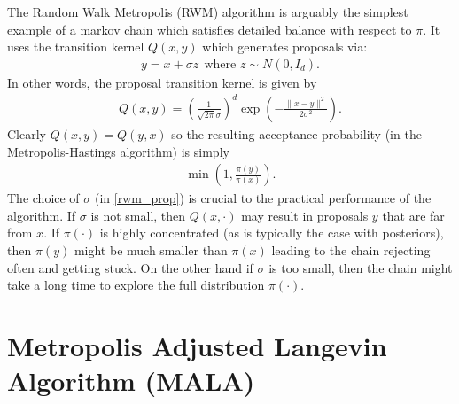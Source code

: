 \documentclass{scrartcl}
\begin{document}
The Random Walk Metropolis (RWM) algorithm is arguably the simplest
example of a markov chain which satisfies detailed balance with
respect to $\pi$. It uses the transition kernel $Q(x, y)$ which
generates proposals via:
\begin{align}\label{rwm_y}
  y = x + \sigma z ~~ \text{where $z \sim N(0, I_d)$}. 
\end{align}
In other words, the proposal transition kernel is given by
\begin{align}\label{rwm_prop}
  Q(x, y) = \left(\frac{1}{\sqrt{2 \pi} \sigma} \right)^d \exp
  \left(-\frac{\|x - y\|^2}{2\sigma^2} \right) . 
\end{align}
Clearly $Q(x, y) = Q(y, x)$ so the resulting acceptance probability
(in the Metropolis-Hastings algorithm) is simply
\begin{align*}
    \min \left(1, \frac{\pi(y)}{\pi(x)} \right). 
\end{align*}
The choice of $\sigma$ (in \eqref{rwm_prop}) is crucial to the
practical performance of the algorithm. If $\sigma$ is not small, then
$Q(x, \cdot)$ may result in proposals $y$ that are far from $x$. If
$\pi(\cdot)$ is highly concentrated (as is 
typically the case with posteriors), then $\pi(y)$ might be much
smaller than $\pi(x)$ leading to the chain rejecting often and getting
stuck. On the other hand if $\sigma$ is too small, then the chain
might take a long time to explore the full distribution $\pi(\cdot)$.

\section{Metropolis Adjusted Langevin Algorithm (MALA)}
\end{document}
